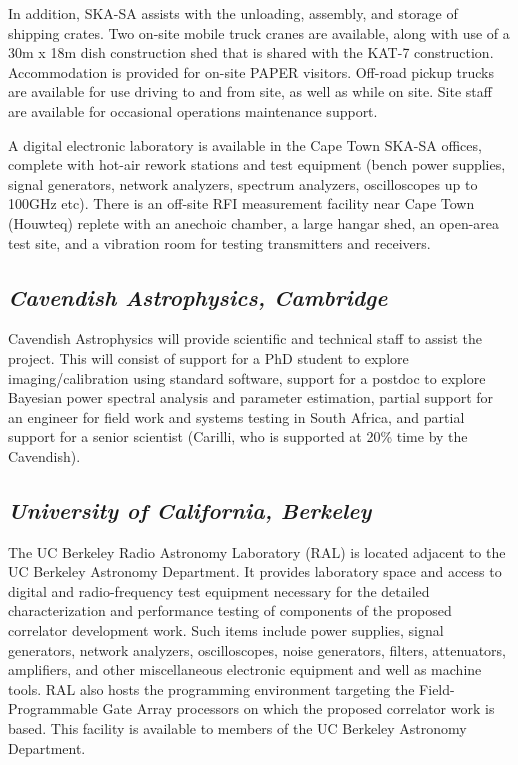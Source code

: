 \documentclass[11pt]{article}
\begin{document}
In addition, SKA-SA assists with the unloading, assembly, and storage of
shipping crates. Two on-site mobile truck cranes are available, along with use
of a 30m x 18m dish construction shed that is shared with the KAT-7 construction.
Accommodation is provided for on-site PAPER visitors. Off-road pickup trucks
are available for use driving to and from site, as well as while on site.  Site staff are available for
occasional operations maintenance support.

A digital electronic laboratory is available in the Cape Town SKA-SA offices,
complete with hot-air rework stations and test equipment (bench
power supplies, signal generators, network analyzers, spectrum analyzers,
oscilloscopes up to 100GHz etc). There is an off-site RFI measurement facility
near Cape Town (Houwteq) replete with 
an anechoic
chamber, a large hangar shed, an open-area test site, and a vibration room for testing
transmitters and receivers.

\subsection*{\it Cavendish Astrophysics, Cambridge}

Cavendish Astrophysics will provide scientific and technical staff to assist the project.  This will consist of
support for a PhD student to explore imaging/calibration using standard software,
support for a postdoc to explore Bayesian power spectral analysis and parameter estimation,
partial support for an engineer for field work and systems testing in South Africa,
and partial support for a senior scientist (Carilli, who is supported at 20\% time by the Cavendish).

\subsection*{\it University of California, Berkeley}

The UC Berkeley Radio Astronomy Laboratory (RAL) is located adjacent to the UC
Berkeley Astronomy Department. It provides laboratory space and access to
digital and radio-frequency test equipment necessary for the detailed
characterization and performance testing of components of the proposed correlator
development work. Such items include power supplies, signal generators, network
analyzers, oscilloscopes, noise generators, filters, attenuators, amplifiers,
and other miscellaneous electronic equipment and well as machine tools. RAL also hosts the programming
environment targeting the Field-Programmable Gate Array processors on which the
proposed correlator work is based. This facility is available to members of the
UC Berkeley Astronomy Department.
\end{document}
